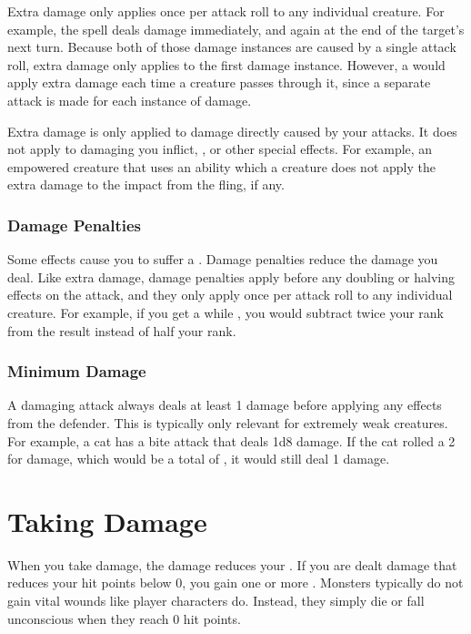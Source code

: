     Extra damage only applies once per attack roll to any individual creature.
    For example, the  spell deals damage immediately, and again at the end of the target's next turn.
    Because both of those damage instances are caused by a single attack roll, extra damage only applies to the first damage instance.
    However, a  would apply extra damage each time a creature passes through it, since a separate attack is made for each instance of damage.

    Extra damage is only applied to damage directly caused by your attacks.
    It does not apply to damaging  you inflict, , or other special effects.
    For example, an empowered creature that uses an ability which  a creature does not apply the extra damage to the impact from the fling, if any.

  \subsubsection{Damage Penalties}\label{Damage Penalties}
    Some effects cause you to suffer a .
    Damage penalties reduce the damage you deal.
    Like extra damage, damage penalties apply before any doubling or halving effects on the attack, and they only apply once per attack roll to any individual creature.
    For example, if you get a  while \sickened, you would subtract twice your rank from the result instead of half your rank.

  \subsubsection{Minimum Damage}
    A damaging attack always deals at least 1 damage before applying any effects from the defender.
    This is typically only relevant for extremely weak creatures.
    For example, a cat has a bite attack that deals 1d8 damage.
    If the cat rolled a 2 for damage, which would be a total of , it would still deal 1 damage.

\section{Taking Damage}\label{Taking Damage}
  When you take damage, the damage reduces your .
  If you are dealt damage that reduces your hit points below 0, you gain one or more .
  Monsters typically do not gain vital wounds like player characters do.
  Instead, they simply die or fall unconscious when they reach 0 hit points.

